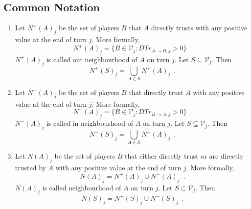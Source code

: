 \documentclass[11pt]{llncs}
\theoremstyle{definition}
\begin{document}
    \subsection{Common Notation}
     \begin{definition}[Neighbourhood]
        \label{neighbourhood}
        \begin{enumerate}
           \item Let $N^{+}\left(A\right)_j$ be the set of players $B$ that $A$ directly trusts with any positive value at
              the end of turn $j$. More formally,
              \begin{equation}
                 N^{+}\left(A\right)_j = \{B \in \mathcal{V}_j : DTr_{A \rightarrow B, j} > 0\} \enspace.
              \end{equation}
              $N^{+}\left(A\right)_j$ is called out neighbourhood of $A$ on turn $j$. Let $S \subseteq \mathcal{V}_j$. Then
              \begin{equation}
                 N^{+}\left(S\right)_j = \bigcup\limits_{A \in S}N^{+}\left(A\right)_j \enspace.
              \end{equation}
           \item Let $N^{-}\left(A\right)_j$ be the set of players $B$ that directly trust $A$ with any positive value at the
              end of turn $j$. More formally,
              \begin{equation}
                 N^{-}\left(A\right)_j = \{B \in \mathcal{V}_j : DTr_{B \rightarrow A, j} > 0\} \enspace.
              \end{equation}
              $N^{-}\left(A\right)_j$ is called in neighbourhood of $A$ on turn $j$. Let $S \subseteq \mathcal{V}_j$. Then
              \begin{equation}
                 N^{-}\left(S\right)_j = \bigcup\limits_{A \in S}N^{-}\left(A\right)_j \enspace.
              \end{equation}
           \item Let $N\left(A\right)_j$ be the set of players $B$ that either directly trust or are directly trusted by $A$
              with any positive value at the end of turn $j$. More formally,
              \begin{equation}
                 N\left(A\right)_j = N^{+}\left(A\right)_j \cup N^{-}\left(A\right)_j \enspace.
              \end{equation}
              $N\left(A\right)_j$ is called neighbourhood of $A$ on turn $j$. Let $S \subset \mathcal{V}_j$. Then
              \begin{equation}
                 N\left(S\right)_j = N^{+}\left(S\right)_j \cup N^{-}\left(S\right)_j \enspace.
              \end{equation}
        \end{enumerate}
     \end{definition}
\end{document}
